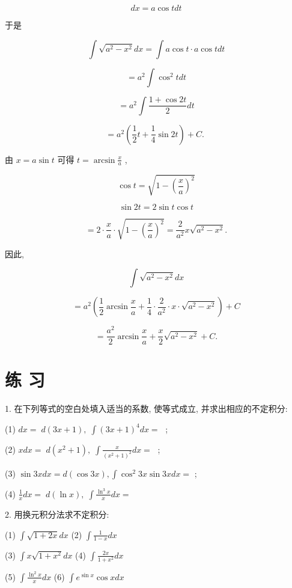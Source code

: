 \documentclass[10pt]{article}
\begin{document}
\[
{dx} = a\cos {tdt}
\]

于是

\[
\int \sqrt{{a}^{2} - {x}^{2}}{dx} = \int a\cos t \cdot a\cos {tdt}
\]

\[
= {a}^{2}\int {\cos }^{2}{tdt}
\]

\[
= {a}^{2}\int \frac{1 + \cos {2t}}{2}{dt}
\]

\[
= {a}^{2}\left( {\frac{1}{2}t + \frac{1}{4}\sin {2t}}\right) + C\text{. }
\]

由 \(x = a\sin t\) 可得 \(t = \arcsin \frac{x}{a}\) ,

\[
\cos t = \sqrt{1 - {\left( \frac{x}{a}\right) }^{2}}
\]

\[
\sin {2t} = 2\sin t\cos t
\]

\[
= 2 \cdot \frac{x}{a} \cdot \sqrt{1 - {\left( \frac{x}{a}\right) }^{2}} = \frac{2}{{a}^{2}}x\sqrt{{a}^{2} - {x}^{2}}.
\]

因此,

\[
\int \sqrt{{a}^{2} - {x}^{2}}{dx}
\]

\[
= {a}^{2}\left( {\frac{1}{2}\arcsin \frac{x}{a} + \frac{1}{4} \cdot \frac{2}{{a}^{2}} \cdot x \cdot \sqrt{{a}^{2} - {x}^{2}}}\right) + C
\]

\[
= \frac{{a}^{2}}{2}\arcsin \frac{x}{a} + \frac{x}{2}\sqrt{{a}^{2} - {x}^{2}} + C.
\]

\section*{练 习}

1. 在下列等式的空白处填入适当的系数, 使等式成立, 并求出相应的不定积分:

(1) \({dx} = \;d\left( {{3x} + 1}\right) ,\;\int {\left( 3x + 1\right) }^{4}{dx} = \;\) ;

(2) \({xdx} = \;d\left( {{x}^{2} + 1}\right) ,\;\int \frac{x}{{\left( {x}^{2} + 1\right) }^{2}}{dx} = \;\) ;

(3) \(\sin {3xdx} = d\left( {\cos {3x}}\right) ,\int {\cos }^{2}{3x}\sin {3xdx} =\) ;

(4) \(\frac{1}{x}{dx} = \;d\left( {\ln x}\right) ,\;\int \frac{{\ln }^{3}x}{x}{dx} =\)

2. 用换元积分法求不定积分:

(1) \(\int \sqrt{1 + {2x}}{dx}\) (2) \(\int \frac{1}{1 - x}{dx}\)

(3) \(\int x\sqrt{1 + {x}^{2}}{dx}\) (4) \(\int \frac{2x}{1 + {x}^{2}}{dx}\)

(5) \(\int \frac{{\ln }^{2}x}{x}{dx}\) (6) \(\int {e}^{\sin x}\cos {xdx}\)
\end{document}
